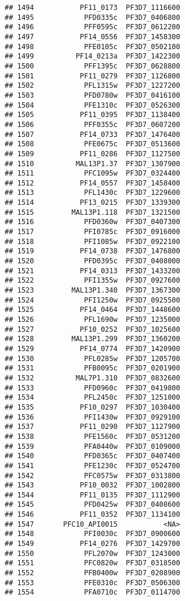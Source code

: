 \documentclass[12pt, a4paper]{article}\usepackage[]{graphicx}\usepackage[]{color}
\makeatletter
\newenvironment{kframe}{%
 \def\at@end@of@kframe{}%
 \ifinner\ifhmode%
  \def\at@end@of@kframe{\end{minipage}}%
  \begin{minipage}{\columnwidth}%
 \fi\fi%
 \def\FrameCommand##1{\hskip\@totalleftmargin \hskip-\fboxsep
 \colorbox{shadecolor}{##1}\hskip-\fboxsep
     \hskip-\linewidth \hskip-\@totalleftmargin \hskip\columnwidth}%
 \MakeFramed {\advance\hsize-\width
   \@totalleftmargin\z@ \linewidth\hsize
   \@setminipage}}%
 {\par\unskip\endMakeFramed%
 \at@end@of@kframe}
\newenvironment{knitrout}{}{} %
\makeatother
\begin{document}
\begin{knitrout}
\begin{kframe}
\begin{verbatim}
## 1494           PF11_0173  PF3D7_1116600
## 1495            PFD0335c  PF3D7_0406800
## 1496            PFF0595c  PF3D7_0612200
## 1497           PF14_0556  PF3D7_1458300
## 1498            PFE0105c  PF3D7_0502100
## 1499          PF14_0213a  PF3D7_1422300
## 1500            PFF1395c  PF3D7_0628800
## 1501           PF11_0279  PF3D7_1126800
## 1502            PFL1315w  PF3D7_1227200
## 1503            PFD0780w  PF3D7_0416100
## 1504            PFE1310c  PF3D7_0526300
## 1505           PF11_0395  PF3D7_1138400
## 1506            PFF0355c  PF3D7_0607200
## 1507           PF14_0733  PF3D7_1476400
## 1508            PFE0675c  PF3D7_0513600
## 1509           PF11_0286  PF3D7_1127500
## 1510          MAL13P1.37  PF3D7_1307900
## 1511            PFC1095w  PF3D7_0324400
## 1512           PF14_0557  PF3D7_1458400
## 1513            PFL1430c  PF3D7_1229600
## 1514           PF13_0215  PF3D7_1339300
## 1515         MAL13P1.118  PF3D7_1321500
## 1516            PFD0360w  PF3D7_0407300
## 1517            PFI0785c  PF3D7_0916000
## 1518            PFI1085w  PF3D7_0922100
## 1519           PF14_0738  PF3D7_1476800
## 1520            PFD0395c  PF3D7_0408000
## 1521           PF14_0313  PF3D7_1433200
## 1522            PFI1355w  PF3D7_0927600
## 1523         MAL13P1.340  PF3D7_1367300
## 1524            PFI1250w  PF3D7_0925500
## 1525           PF14_0464  PF3D7_1448600
## 1526            PFL1690w  PF3D7_1235000
## 1527           PF10_0252  PF3D7_1025600
## 1528         MAL13P1.299  PF3D7_1360200
## 1529           PF14_0774  PF3D7_1420900
## 1530            PFL0285w  PF3D7_1205700
## 1531            PFB0095c  PF3D7_0201900
## 1532          MAL7P1.310  PF3D7_0832600
## 1533            PFD0960c  PF3D7_0419800
## 1534            PFL2450c  PF3D7_1251000
## 1535           PF10_0297  PF3D7_1030400
## 1536            PFI1430w  PF3D7_0929100
## 1537           PF11_0290  PF3D7_1127900
## 1538            PFE1560c  PF3D7_0531200
## 1539            PFA0440w  PF3D7_0109000
## 1540            PFD0365c  PF3D7_0407400
## 1541            PFE1230c  PF3D7_0524700
## 1542            PFC0575w  PF3D7_0313800
## 1543           PF10_0032  PF3D7_1002800
## 1544           PF11_0135  PF3D7_1112900
## 1545            PFD0425w  PF3D7_0408600
## 1546           PF11_0352  PF3D7_1134100
## 1547       PFC10_API0015           <NA>
## 1548            PFI0030c  PF3D7_0900600
## 1549           PF14_0276  PF3D7_1429700
## 1550            PFL2070w  PF3D7_1243000
## 1551            PFC0820w  PF3D7_0318500
## 1552            PFB0400w  PF3D7_0208900
## 1553            PFE0310c  PF3D7_0506300
## 1554            PFA0710c  PF3D7_0114700

\end{verbatim}
\end{kframe}
\end{knitrout}
\end{document}
